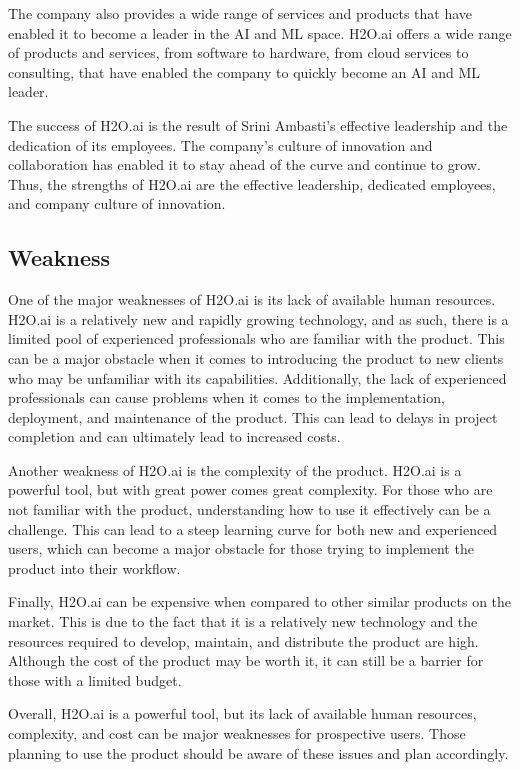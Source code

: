 \documentclass[12pt,a4paper]{report}
\begin{document}
The company also provides a wide range of services and products that have enabled it to become a leader in the AI and ML space. H2O.ai offers a wide range of products and services, from software to hardware, from cloud services to consulting, that have enabled the company to quickly become an AI and ML leader.

The success of H2O.ai is the result of Srini Ambasti's effective leadership and the dedication of its employees. The company's culture of innovation and collaboration has enabled it to stay ahead of the curve and continue to grow. Thus, the strengths of H2O.ai are the effective leadership, dedicated employees, and company culture of innovation.

\subsection{Weakness}

One of the major weaknesses of H2O.ai is its lack of available human resources. H2O.ai is a relatively new and rapidly growing technology, and as such, there is a limited pool of experienced professionals who are familiar with the product. This can be a major obstacle when it comes to introducing the product to new clients who may be unfamiliar with its capabilities. Additionally, the lack of experienced professionals can cause problems when it comes to the implementation, deployment, and maintenance of the product. This can lead to delays in project completion and can ultimately lead to increased costs.

Another weakness of H2O.ai is the complexity of the product. H2O.ai is a powerful tool, but with great power comes great complexity. For those who are not familiar with the product, understanding how to use it effectively can be a challenge. This can lead to a steep learning curve for both new and experienced users, which can become a major obstacle for those trying to implement the product into their workflow.

Finally, H2O.ai can be expensive when compared to other similar products on the market. This is due to the fact that it is a relatively new technology and the resources required to develop, maintain, and distribute the product are high. Although the cost of the product may be worth it, it can still be a barrier for those with a limited budget.

Overall, H2O.ai is a powerful tool, but its lack of available human resources, complexity, and cost can be major weaknesses for prospective users. Those planning to use the product should be aware of these issues and plan accordingly.
\end{document}
